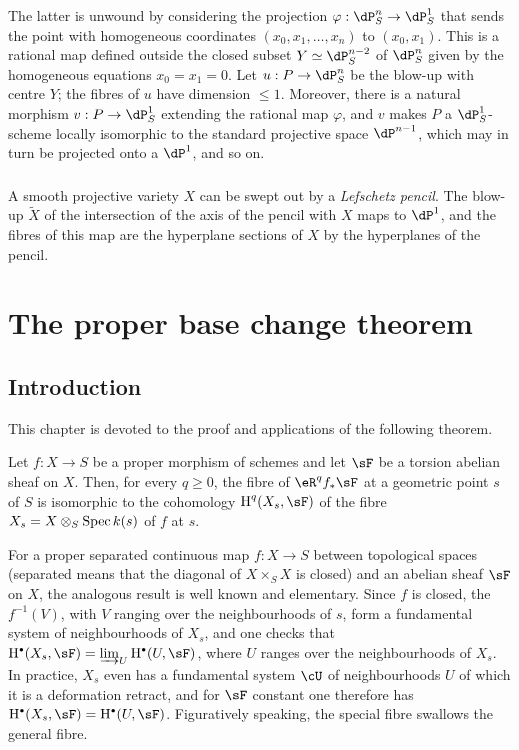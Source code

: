 The latter is unwound by considering the projection
$\varphi:\dP_S^n\to\dP_S^1$ that sends the point with homogeneous
coordinates $(x_0,x_1,\dotsc,x_n)$ to $(x_0,x_1)$. This is a rational
map defined outside the closed subset $Y\simeq\dP_S^{n-2}$ of
$\dP_S^n$ given by the homogeneous equations $x_0=x_1=0$. Let
$u:P\to\dP_S^n$ be the blow-up with centre $Y$; the fibres of $u$ have
dimension $\leqslant1$. Moreover, there is a natural morphism
$v:P\to\dP_S^1$ extending the rational map $\varphi$, and $v$ makes
$P$ a $\dP_S^1$-scheme locally isomorphic to the standard projective
space $\dP^{n-1}$, which may in turn be projected onto a $\dP^1$, and
so on.

\subsubsection{}\label{I:3-4-4}

A smooth projective variety $X$ can be swept out by a
\emph{Lefschetz pencil}. The blow-up $\widetilde X$ of the intersection
of the axis of the pencil with $X$ maps to $\dP^1$, and the fibres of
this map are the hyperplane sections of $X$ by the hyperplanes of the
pencil.

\section{The proper base change theorem}\label{I:4}

\subsection{Introduction}\label{I:4-1}

This chapter is devoted to the proof and applications of the following
theorem.

\begin{theorem}\label{I:4-1-1}
Let $f:X\to S$ be a proper morphism of schemes and let $\sF$ be a
torsion abelian sheaf on $X$. Then, for every $q\geqslant0$, the fibre
of $\eR^qf_*\sF$ at a geometric point $s$ of $S$ is isomorphic to the
cohomology $\h^q(X_s,\sF)$ of the fibre
$X_s=X\otimes_S\operatorname{Spec} k(s)$ of $f$ at $s$.
\end{theorem}

For a proper separated continuous map $f:X\to S$ between topological
spaces (separated means that the diagonal of $X\times_SX$ is closed) and
an abelian sheaf $\sF$ on $X$, the analogous result is well known and
elementary. Since $f$ is closed, the $f^{-1}(V)$, with $V$ ranging over
the neighbourhoods of $s$, form a fundamental system of neighbourhoods
of $X_s$, and one checks that
$\h^\bullet(X_s,\sF)=\varinjlim_U\h^\bullet(U,\sF)$, where $U$ ranges
over the neighbourhoods of $X_s$. In practice, $X_s$ even has a
fundamental system $\cU$ of neighbourhoods $U$ of which it is a
deformation retract, and for $\sF$ constant one therefore has
$\h^\bullet(X_s,\sF)=\h^\bullet(U,\sF)$. Figuratively speaking, the
special fibre swallows the general fibre.

